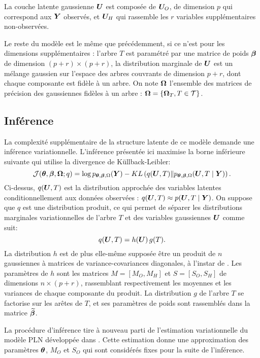 La couche latente gaussienne ${\boldsymbol{U}}$ est composée de ${\boldsymbol{U}}_O$, de dimension $p$ qui correspond aux ${\boldsymbol{Y}}$ observés, et ${\boldsymbol{U}}_H$ qui rassemble les $r$ variables supplémentaires non-observées. 

Le reste du modèle est le même que précédemment, si ce n'est pour les dimensions supplémentaires : l'arbre $T$  est paramétré par une matrice de poids ${\boldsymbol{\beta}}$ de dimension $(p+r)\times (p+r)$, la distribution marginale de ${\boldsymbol{U}}$ est un mélange gaussien sur l'espace des arbres couvrants de dimension $p+r$, dont chaque composante est fidèle à un arbre. On note ${\boldsymbol{\Omega}}$ l'ensemble des matrices de précision des gaussiennes fidèles à un arbre : ${\boldsymbol{\Omega}} = \{{\boldsymbol{\Omega}}_T, T\in \mathcal{T}\}$. 
 
\subsection*{Inférence}
La complexité supplémentaire de la structure latente de ce modèle demande une inférence variationnelle. L'inférence présentée ici maximise la borne inférieure suivante qui utilise la divergence de Küllback-Leibler:
$${\mathcal{J}}({\boldsymbol{\theta}}, {\boldsymbol{\beta}}, {\boldsymbol{\Omega}}; q)= \log p_{{\boldsymbol{\theta}}, {\boldsymbol{\beta}}, \Omega}({\boldsymbol{Y}}) - KL\left(q({\boldsymbol{U}}, T) \| p_{{\boldsymbol{\theta}}, {\boldsymbol{\beta}}, \Omega}({\boldsymbol{U}}, T \mid {\boldsymbol{Y}}) \right).$$
Ci-dessus, $q({\boldsymbol{U}}, T)$ est la distribution approchée des variables latentes conditionnellement aux données observées : $q({\boldsymbol{U}}, T)\approx p({\boldsymbol{U}}, T \mid {\boldsymbol{Y}})$. On suppose que $q$ est une distribution produit, ce qui permet de séparer les distributions marginales variationnelles de l'arbre $T$ et des variables gaussiennes ${\boldsymbol{U}}$ comme suit:
$$q({\boldsymbol{U}}, T) = h({\boldsymbol{U}}) \,g(T).$$
La distribution $h$ est de plus elle-même supposée être un produit de $n$ gaussiennes à matrices de variance-covariances diagonales, à l'instar de \citet{CMR18}. Les paramètres de $h$ sont les matrices $M=[M_O, M_H]$ et $S=[S_O, S_H]$ de dimensions $n\times (p+r)$, rassemblant respectivement les moyennes et les variances de chaque composante du produit.
La distribution $g$ de l'arbre $T$ se factorise sur les arêtes de $T$, et ses paramètres de poids sont rassemblés dans la matrice $\widetilde{{\boldsymbol{\beta}}}$.

La procédure d'inférence tire à nouveau parti de l'estimation variationnelle du modèle PLN développée dans \citet{CMR18}. Cette estimation donne une approximation des paramètres ${\boldsymbol{\theta}}$, $M_O$ et $S_O$ qui sont considérés fixes pour la suite de l'inférence.

